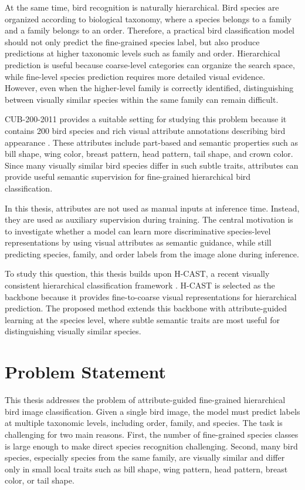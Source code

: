 At the same time, bird recognition is naturally hierarchical. Bird species are organized according to biological taxonomy, where a species belongs to a family and a family belongs to an order. Therefore, a practical bird classification model should not only predict the fine-grained species label, but also produce predictions at higher taxonomic levels such as family and order. Hierarchical prediction is useful because coarse-level categories can organize the search space, while fine-level species prediction requires more detailed visual evidence. However, even when the higher-level family is correctly identified, distinguishing between visually similar species within the same family can remain difficult.

CUB-200-2011 provides a suitable setting for studying this problem because it contains 200 bird species and rich visual attribute annotations describing bird appearance \cite{wah2011cub}. These attributes include part-based and semantic properties such as bill shape, wing color, breast pattern, head pattern, tail shape, and crown color. Since many visually similar bird species differ in such subtle traits, attributes can provide useful semantic supervision for fine-grained hierarchical bird classification.

In this thesis, attributes are not used as manual inputs at inference time. Instead, they are used as auxiliary supervision during training. The central motivation is to investigate whether a model can learn more discriminative species-level representations by using visual attributes as semantic guidance, while still predicting species, family, and order labels from the image alone during inference.

To study this question, this thesis builds upon H-CAST, a recent visually consistent hierarchical classification framework \cite{park2025visually}. H-CAST is selected as the backbone because it provides fine-to-coarse visual representations for hierarchical prediction. The proposed method extends this backbone with attribute-guided learning at the species level, where subtle semantic traits are most useful for distinguishing visually similar species.




\section{Problem Statement}

This thesis addresses the problem of attribute-guided fine-grained hierarchical bird image classification. Given a single bird image, the model must predict labels at multiple taxonomic levels, including order, family, and species. The task is challenging for two main reasons. First, the number of fine-grained species classes is large enough to make direct species recognition challenging. Second, many bird species, especially species from the same family, are visually similar and differ only in small local traits such as bill shape, wing pattern, head pattern, breast color, or tail shape.

